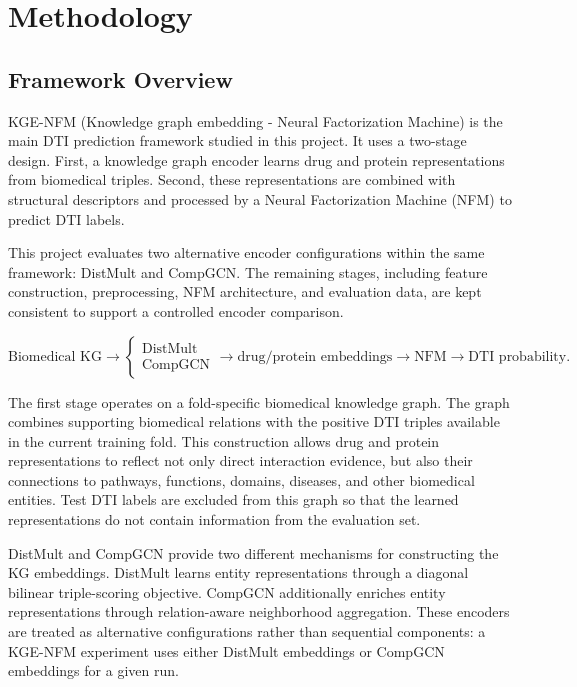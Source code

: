 \chapter{Methodology}
\label{chap:methodology}

\section{Framework Overview}

KGE-NFM (Knowledge graph embedding - Neural Factorization Machine) is the main DTI prediction framework studied in this project. It uses
a two-stage design. First, a knowledge graph encoder learns drug and protein
representations from biomedical triples. Second, these representations are
combined with structural descriptors and processed by a Neural Factorization
Machine (NFM) to predict DTI labels.

This project evaluates two alternative encoder configurations within the same
framework: DistMult and CompGCN. The remaining stages, including feature
construction, preprocessing, NFM architecture, and evaluation data, are kept
consistent to support a controlled encoder comparison.

\begin{equation}
    \text{Biomedical KG}
    \rightarrow
    \left\{
        \begin{array}{c}
            \text{DistMult}\\
            \text{CompGCN}
        \end{array}
    \right.
    \rightarrow
    \text{drug/protein embeddings}
    \rightarrow
    \text{NFM}
    \rightarrow
    \text{DTI probability}.
\end{equation}

The first stage operates on a fold-specific biomedical knowledge graph. The
graph combines supporting biomedical relations with the positive DTI triples
available in the current training fold. This construction allows drug and
protein representations to reflect not only direct interaction evidence, but
also their connections to pathways, functions, domains, diseases, and other
biomedical entities. Test DTI labels are excluded from this graph so that the
learned representations do not contain information from the evaluation set.

DistMult and CompGCN provide two different mechanisms for constructing the KG
embeddings. DistMult learns entity representations through a diagonal
bilinear triple-scoring objective. CompGCN additionally enriches entity
representations through relation-aware neighborhood aggregation. These
encoders are treated as alternative configurations rather than sequential
components: a KGE-NFM experiment uses either DistMult embeddings or CompGCN
embeddings for a given run.

